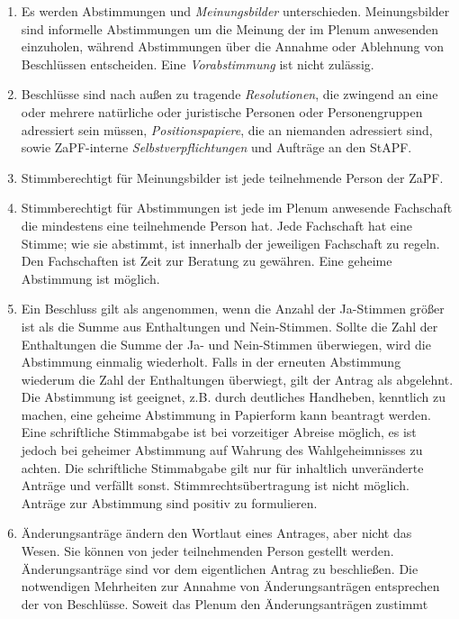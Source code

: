 \documentclass[
  a4paper,
  oneside]{scrartcl}
\providecommand{\tightlist}{%
  \setlength{\itemsep}{0pt}\setlength{\parskip}{0pt}}
\begin{document}
\begin{enumerate}
\def\labelenumi{\arabic{enumi}.}
\tightlist
\item
  Es werden Abstimmungen und \emph{Meinungsbilder} unterschieden.
  Meinungsbilder sind informelle Abstimmungen um die Meinung der im
  Plenum anwesenden einzuholen, während Abstimmungen über die Annahme
  oder Ablehnung von Beschlüssen entscheiden. Eine \emph{Vorabstimmung}
  ist nicht zulässig.
\item
  Beschlüsse sind nach außen zu tragende \emph{Resolutionen}, die
  zwingend an eine oder mehrere natürliche oder juristische Personen
  oder Personengruppen adressiert sein müssen, \emph{Positionspapiere},
  die an niemanden adressiert sind, sowie ZaPF-interne
  \emph{Selbstverpflichtungen} und Aufträge an den StAPF.
\item
  Stimmberechtigt für Meinungsbilder ist jede teilnehmende Person der
  ZaPF.
\item
  Stimmberechtigt für Abstimmungen ist jede im Plenum anwesende
  Fachschaft die mindestens eine teilnehmende Person hat. Jede
  Fachschaft hat eine Stimme; wie sie abstimmt, ist innerhalb der
  jeweiligen Fachschaft zu regeln. Den Fachschaften ist Zeit zur
  Beratung zu gewähren. Eine geheime Abstimmung ist möglich.
\item
  Ein Beschluss gilt als angenommen, wenn die Anzahl der Ja-Stimmen
  größer ist als die Summe aus Enthaltungen und Nein-Stimmen. Sollte die
  Zahl der Enthaltungen die Summe der Ja- und Nein-Stimmen überwiegen,
  wird die Abstimmung einmalig wiederholt. Falls in der erneuten
  Abstimmung wiederum die Zahl der Enthaltungen überwiegt, gilt der
  Antrag als abgelehnt. Die Abstimmung ist geeignet, z.B. durch
  deutliches Handheben, kenntlich zu machen, eine geheime Abstimmung in
  Papierform kann beantragt werden. Eine schriftliche Stimmabgabe ist
  bei vorzeitiger Abreise möglich, es ist jedoch bei geheimer Abstimmung
  auf Wahrung des Wahlgeheimnisses zu achten. Die schriftliche
  Stimmabgabe gilt nur für inhaltlich unveränderte Anträge und verfällt
  sonst. Stimmrechtsübertragung ist nicht möglich. Anträge zur
  Abstimmung sind positiv zu formulieren.
\item
  Änderungsanträge ändern den Wortlaut eines Antrages, aber nicht das
  Wesen. Sie können von jeder teilnehmenden Person gestellt werden.
  Änderungsanträge sind vor dem eigentlichen Antrag zu beschließen. Die
  notwendigen Mehrheiten zur Annahme von Änderungsanträgen entsprechen
  der von Beschlüsse. Soweit das Plenum den Änderungsanträgen zustimmt

\end{enumerate}
\end{document}
